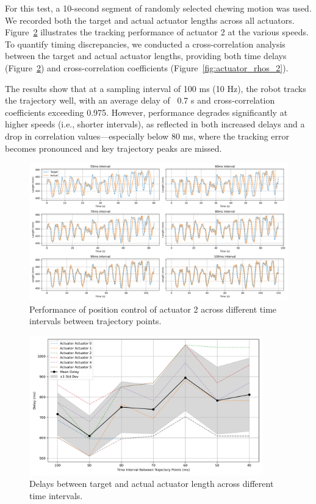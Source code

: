 For this test, a 10-second segment of randomly selected chewing motion was used. We recorded both the target and actual actuator lengths across all 
actuators. Figure~\ref{fig:actuator_delays_2} illustrates the tracking performance of actuator 2 at the various speeds. To quantify timing discrepancies, we 
conducted a cross-correlation analysis between the target and actual actuator lengths, providing both time delays (Figure~\ref{fig:actuator_delays_2}) 
and cross-correlation coefficients (Figure~\ref{fig:actuator_rhos_2}).

The results show that at a sampling interval of 100 ms (10 Hz), the robot tracks the trajectory well, with an average delay of ~0.7 s and 
cross-correlation coefficients exceeding 0.975. However, performance degrades significantly at higher speeds (i.e., shorter intervals), 
as reflected in both increased delays and a drop in correlation values—especially below 80 ms, where the tracking error becomes pronounced 
and key trajectory peaks are missed.

\begin{figure}[H]
    \centering
    \includegraphics[width=\textwidth]{figures/actuator_2_trajectories.png}
    \caption{Performance of position control of actuator 2 across different time intervals between trajectory points.}
    \label{fig:position_control}
\end{figure}

\begin{figure}[H]
    \centering
    \includegraphics[width=0.9\textwidth]{figures/actuator_delays.png}
    \caption{Delays between target and actual actuator length across different time intervals.}
    \label{fig:actuator_delays_2}
\end{figure}

